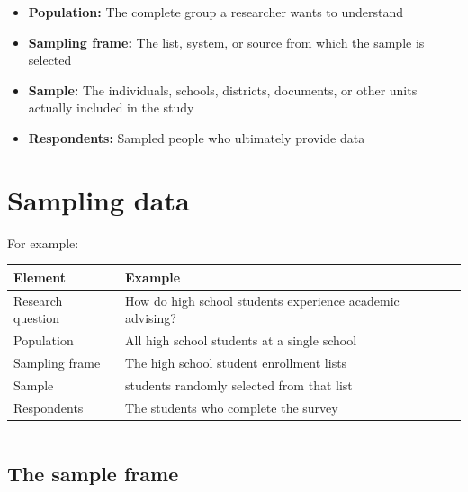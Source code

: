 \documentclass[
  letterpaper,
  DIV=11,
  numbers=noendperiod]{scrartcl}
\providecommand{\tightlist}{%
  \setlength{\itemsep}{0pt}\setlength{\parskip}{0pt}}\usepackage{longtable,booktabs,array}
\begin{document}
\begin{itemize}
\tightlist
\item
  \textbf{Population:} The complete group a researcher wants to
  understand
\item
  \textbf{Sampling frame:} The list, system, or source from which the
  sample is selected
\item
  \textbf{Sample:} The individuals, schools, districts, documents, or
  other units actually included in the study
\item
  \textbf{Respondents:} Sampled people who ultimately provide data
\end{itemize}

\section{Sampling data}\label{sampling-data-1}

For example:

\begin{longtable}[]{@{}
  >{\raggedright\arraybackslash}p{}
  >{\raggedright\arraybackslash}p{}@{}}
\toprule\noalign{}
\begin{minipage}[b]{\linewidth}\raggedright
Element
\end{minipage} & \begin{minipage}[b]{\linewidth}\raggedright
Example
\end{minipage} \\
\midrule\noalign{}
\endhead
\bottomrule\noalign{}
\endlastfoot
Research question & How do high school students experience academic
advising? \\
Population & All high school students at a single school \\
Sampling frame & The high school student enrollment lists \\
Sample & 500 students randomly selected from that list \\
Respondents & The students who complete the survey \\
\end{longtable}

\begin{center}\rule{0.5\linewidth}{0.5pt}\end{center}

\subsection{The sample frame}\label{the-sample-frame}
\end{document}
